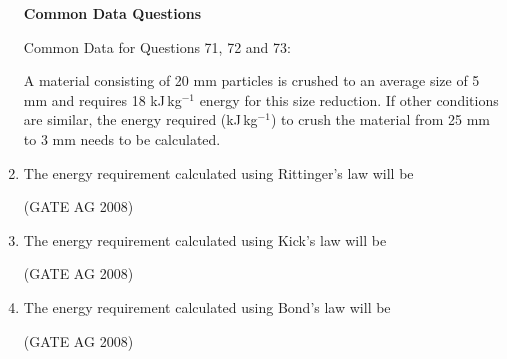 \documentclass[journal,12pt,onecolumn]{IEEEtran}
\begin{document}
\begin{enumerate}
\medskip

\textbf{Common Data Questions}

Common Data for Questions 71, 72 and 73:

A material consisting of 20 mm particles is crushed to an average size of 5 mm and requires 18 kJ\,kg$^{-1}$ energy for this size reduction. If other conditions are similar, the energy required (kJ\,kg$^{-1}$) to crush the material from 25 mm to 3 mm needs to be calculated.

\item 
 The energy requirement calculated using Rittinger's law will be
\begin{enumerate}
\end{enumerate}
\hfill(GATE AG 2008)\\

\medskip

\item 
 The energy requirement calculated using Kick's law will be
\begin{enumerate}
\end{enumerate}
\hfill(GATE AG 2008)\\

\medskip

\item 
 The energy requirement calculated using Bond's law will be
\begin{enumerate}
\end{enumerate}
\hfill(GATE AG 2008)\\


\end{enumerate}
\end{document}
